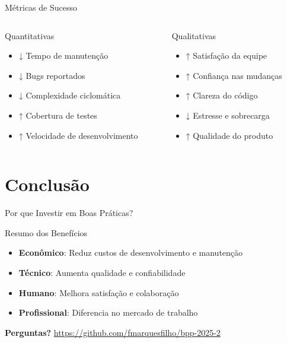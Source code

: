 \documentclass[10pt, aspectratio=169]{beamer}
\begin{document}
\begin{frame}{Métricas de Sucesso}
\begin{columns}
\begin{column}{0.5\textwidth}
\begin{block}{Quantitativas}
\begin{itemize}
    \item ↓ Tempo de manutenção
    \item ↓ Bugs reportados
    \item ↓ Complexidade ciclomática
    \item ↑ Cobertura de testes
    \item ↑ Velocidade de desenvolvimento
\end{itemize}
\end{block}
\end{column}
\begin{column}{0.5\textwidth}
\begin{block}{Qualitativas}
\begin{itemize}
    \item ↑ Satisfação da equipe
    \item ↑ Confiança nas mudanças
    \item ↑ Clareza do código
    \item ↓ Estresse e sobrecarga
    \item ↑ Qualidade do produto
\end{itemize}
\end{block}
\end{column}
\end{columns}
\end{frame}

\section{Conclusão}
\begin{frame}{Por que Investir em Boas Práticas?}
\begin{block}{Resumo dos Benefícios}
\begin{itemize}
    \item \textbf{Econômico}: Reduz custos de desenvolvimento e manutenção
    \item \textbf{Técnico}: Aumenta qualidade e confiabilidade
    \item \textbf{Humano}: Melhora satisfação e colaboração
    \item \textbf{Profissional}: Diferencia no mercado de trabalho
\end{itemize}
\end{block}

\begin{center}
\end{center}
\end{frame}

\begin{frame}
\centering
\Huge \textbf{Perguntas?}
\vspace{2cm}
\small \url{https://github.com/fmarquesfilho/bpp-2025-2}

\end{frame}
\end{document}
